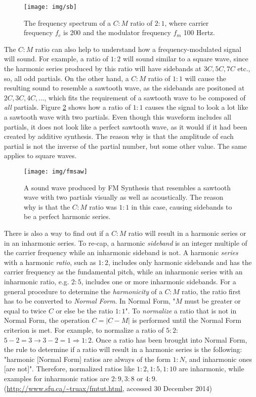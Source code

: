  \begin{figure}[]
    \texttt{[image: img/sb]}
    \caption{The frequency spectrum of a $C:M$ ratio of $2:1$, where carrier frequency $f_{c}$ is 200 and the modulator frequency $f_{m}$ 100 Hertz.}
    \label{fig:sb}
  \end{figure}

  \pagebreak

  \noindent The $C:M$ ratio can also help to understand how a frequency-modulated signal will sound. For example, a ratio of $1:2$ will sound similar to a square wave, since the harmonic series produced by this ratio will have sidebands at $3C, 5C, 7C$ etc., so, all odd partials. On the other hand, a $C:M$ ratio of $1:1$ will cause the resulting sound to resemble a sawtooth wave, as the sidebands are positoned at $2C, 3C, 4C, ...$, which fits the requirement of a sawtooth wave to be composed of \emph{all} partials. Figure \ref{fig:fmsaw} shows how a ratio of $1:1$ causes the signal to look a lot like a sawtooth wave with two partials. Even though this waveform includes all partials, it does not look like a perfect sawtooth wave, as it would if it had been created by additive synthesis. The reason why is that the amplitude of each partial is not the inverse of the partial number, but some other value. The same applies to square waves.\\

  \begin{figure}[]
    \texttt{[image: img/fmsaw]}
    \caption{A sound wave produced by FM Synthesis that resembles a sawtooth wave with two partials visually as well as acoustically. The reason why is that the $C:M$ ratio was $1:1$ in this case, causing sidebands to be a perfect harmonic series.}
    \label{fig:fmsaw}
  \end{figure}

  \noindent There is also a way to find out if a $C:M$ ratio will result in a harmonic series or in an inharmonic series. To re-cap, a harmonic \emph{sideband} is an integer multiple of the carrier frequency while an inharmonic sideband is not. A harmonic \emph{series} with a harmonic \emph{ratio}, such as $1:2$, includes only harmonic sidebands and has the carrier frequency as the fundamental pitch, while an inharmonic series with an inharmonic ratio, e.g. $2:5$, includes one or more inharmonic sidebands. For a general procedure to determine the \emph{harmonicity} of a $C:M$ ratio, the ratio first has to be converted to \emph{Normal Form}. In Normal Form, "$M$ must be greater or equal to twice $C$ or else be the ratio $1:1$". To \emph{normalize} a ratio that is not in Normal Form, the operation $C = | C - M |$ is performed until the Normal Form criterion is met. For example, to normalize a ratio of $5:2$: $5 - 2 = 3 \rightarrow 3 - 2 = 1 \Rightarrow 1:2$. Once a ratio has been brought into Normal Form, the rule to determine if a ratio will result in a harmonic series is the following: "harmonic [Normal Form] ratios are always of the form $1:N$, and inharmonic ones [are not]". Therefore, normalized ratios like
  $1:2, 1:5, 1:10$ are inharmonic, while examples for inharmonic ratios are $2:9, 3:8 \text{ or } 4:9$.
  (\url{http://www.sfu.ca/~truax/fmtut.html}, accessed 30 December 2014)

